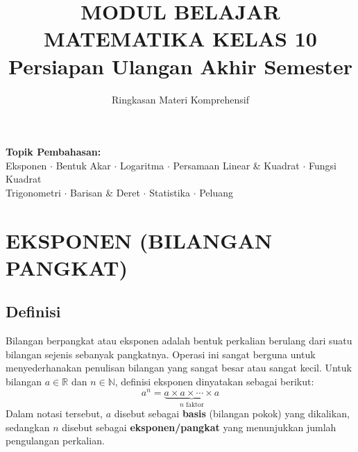 \documentclass[12pt, a4paper]{article}
\title{MODUL BELAJAR MATEMATIKA KELAS 10\\ \large Persiapan Ulangan Akhir Semester}
\author{Ringkasan Materi Komprehensif}
\date{}
\begin{document}
\maketitle

\begin{center}
    \textbf{Topik Pembahasan:} \\
    Eksponen $\cdot$ Bentuk Akar $\cdot$ Logaritma $\cdot$ Persamaan Linear \& Kuadrat $\cdot$ Fungsi Kuadrat \\
    Trigonometri $\cdot$ Barisan \& Deret $\cdot$ Statistika $\cdot$ Peluang
\end{center}

\tableofcontents
\newpage

\section{EKSPONEN (BILANGAN PANGKAT)}

\subsection{Definisi}
Bilangan berpangkat atau eksponen adalah bentuk perkalian berulang dari suatu bilangan sejenis sebanyak pangkatnya. Operasi ini sangat berguna untuk menyederhanakan penulisan bilangan yang sangat besar atau sangat kecil. Untuk bilangan $a \in \mathbb{R}$ dan $n \in \mathbb{N}$, definisi eksponen dinyatakan sebagai berikut:
\[
  a^n = \underbrace{a \times a \times \cdots \times a}_{n \text{ faktor}}
\]
Dalam notasi tersebut, $a$ disebut sebagai \textbf{basis} (bilangan pokok) yang dikalikan, sedangkan $n$ disebut sebagai \textbf{eksponen/pangkat} yang menunjukkan jumlah pengulangan perkalian.
\end{document}
